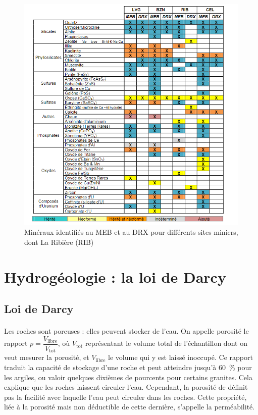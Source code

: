 \documentclass{article}
\begin{document}
\begin{figure}[H]
    \centering
    \includegraphics[width = \textwidth]{A_III_B_2_2.png}
    \caption{Minéraux identifiés au MEB et au DRX pour différents sites miniers, dont La Ribière (RIB) \cite{caracterisation_residus_2014}}
    \label{fig:rib_mineraux_presence}
\end{figure}


\newpage
\section{Hydrogéologie : la loi de Darcy}
\label{annexe:loi_darcy}
\subsection{Loi de Darcy}

\paragraph{} Les roches sont poreuses : elles peuvent stocker de l’eau. On appelle porosité le rapport $p=\dfrac{V_{\text{libre}}}{V_{\text{tot}}}$, où $V_{\text{tot}}$ représentant le volume total de l'échantillon dont on veut mesurer la porosité, et $V_{\text{libre}}$ le volume qui y est laissé inoccupé. Ce rapport traduit la capacité de stockage d'une roche et peut atteindre jusqu’à 60~\% pour les argiles, ou valoir quelques dixièmes de pourcents pour certains granites. Cela explique que les roches laissent circuler l’eau. Cependant, la porosité de définit pas la facilité avec laquelle l’eau peut circuler dans les roches. Cette propriété, liée à la porosité mais non déductible de cette dernière, s’appelle la perméabilité.
\end{document}
